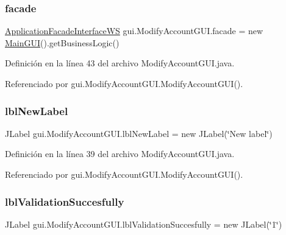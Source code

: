 \subsubsection{\texorpdfstring{facade}{facade}}
{\footnotesize\ttfamily \mbox{\hyperlink{interfacebusiness_logic_1_1_application_facade_interface_w_s}{Application\+Facade\+Interface\+WS}} gui.\+Modify\+Account\+G\+U\+I.\+facade = new \mbox{\hyperlink{classgui_1_1_main_g_u_i}{Main\+G\+UI}}().get\+Business\+Logic()\hspace{0.3cm}{\ttfamily [private]}}



Definición en la línea 43 del archivo Modify\+Account\+G\+U\+I.\+java.



Referenciado por gui.\+Modify\+Account\+G\+U\+I.\+Modify\+Account\+G\+U\+I().

\mbox{\label{classgui_1_1_modify_account_g_u_i_a5df2167d933511b49e57a083d10f7cb7}} 
\subsubsection{\texorpdfstring{lblNewLabel}{lblNewLabel}}
{\footnotesize\ttfamily J\+Label gui.\+Modify\+Account\+G\+U\+I.\+lbl\+New\+Label = new J\+Label(\char`\"{}New label\char`\"{})\hspace{0.3cm}{\ttfamily [private]}}



Definición en la línea 39 del archivo Modify\+Account\+G\+U\+I.\+java.



Referenciado por gui.\+Modify\+Account\+G\+U\+I.\+Modify\+Account\+G\+U\+I().

\mbox{\label{classgui_1_1_modify_account_g_u_i_a152e659fd97ffc8f00d87e437dbf53a8}} 
\subsubsection{\texorpdfstring{lblValidationSuccesfully}{lblValidationSuccesfully}}
{\footnotesize\ttfamily J\+Label gui.\+Modify\+Account\+G\+U\+I.\+lbl\+Validation\+Succesfully = new J\+Label(\char`\"{}1\char`\"{})\hspace{0.3cm}{\ttfamily [private]}}



